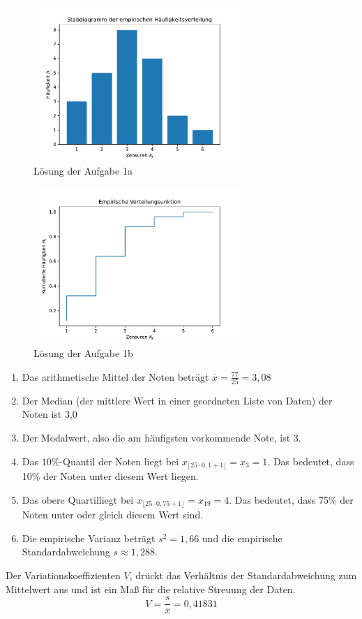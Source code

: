 \documentclass[main.tex]{subfiles}
\begin{document}
\begin{figure}[h]
    \begin{center}
        \includegraphics[width=0.7\textwidth]{A1-a.pdf}
        \caption{Lösung der Aufgabe 1a}
    \end{center}
\end{figure}

\begin{figure}[h!]
    \begin{center}
        \includegraphics[width=0.7\textwidth]{A1-b.pdf}
        \caption{Lösung der Aufgabe 1b}
    \end{center}
\end{figure}
\renewcommand{\labelenumi}{\theenumi}
\renewcommand{\theenumi}{\roman{enumi}.}%
\begin{enumerate}
    \item Das arithmetische Mittel der Noten beträgt $\overline{x}=\frac{77}{25} = 3,08$
    \item Der Median (der mittlere Wert in einer geordneten Liste von Daten) der Noten ist 3,0
    \item Der Modalwert, also die am häufigsten vorkommende Note, ist 3.
    \item Das $10\%$-Quantil der Noten liegt bei $x_{\lfloor 25 \cdot 0,1 + 1 \rfloor} = x_3 = 1$. Das bedeutet, dass 10\% der Noten unter diesem Wert liegen.
    \item Das obere Quartilliegt bei $x_{\lfloor 25 \cdot 0,75 +1 \rfloor} = x_{19} = 4$. Das bedeutet, dass 75\% der Noten unter oder gleich diesem Wert sind.
    \item Die empirische Varianz beträgt $s^2 = 1,66$ und die empirische Standardabweichung $s \approx 1,288$.
\end{enumerate}

Der Variationskoeffizienten $V$, drückt das Verhältnis der Standardabweichung zum Mittelwert aus und ist ein Maß für die relative Streuung der Daten.
$$
    V = \frac{s}{\overline{x}} = 0,41831
$$
\end{document}
